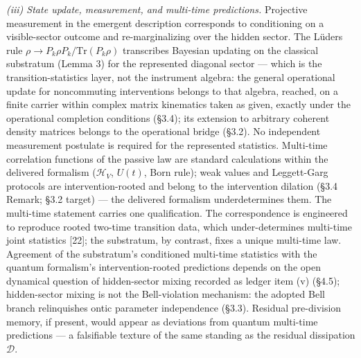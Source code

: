\documentclass[
]{article}
\begin{document}
\emph{(iii) State update, measurement, and multi-time predictions.}
Projective measurement in the emergent description corresponds to
conditioning on a visible-sector outcome and re-marginalizing over the
hidden sector. The Lüders rule
\(\rho \to P_k \rho P_k / \text{Tr}(P_k \rho)\) transcribes Bayesian
updating on the classical substratum (Lemma 3) for the represented
diagonal sector --- which is the transition-statistics layer, not the
instrument algebra: the general operational update for noncommuting
interventions belongs to that algebra, reached, on a finite carrier
within complex matrix kinematics taken as given, exactly under the
operational completion conditions (§3.4); its extension to arbitrary
coherent density matrices belongs to the operational bridge (§3.2). No
independent measurement postulate is required for the represented
statistics. Multi-time correlation functions of the passive law are
standard calculations within the delivered formalism (\(\mathcal{H}_V\),
\(U(t)\), Born rule); weak values and Leggett-Garg protocols are
intervention-rooted and belong to the intervention dilation (§3.4
Remark; §3.2 target) --- the delivered formalism underdetermines them.
The multi-time statement carries one qualification. The correspondence
is engineered to reproduce rooted two-time transition data, which
under-determines multi-time joint statistics {[}22{]}; the substratum,
by contrast, fixes a unique multi-time law. Agreement of the
substratum's conditioned multi-time statistics with the quantum
formalism's intervention-rooted predictions depends on the open
dynamical question of hidden-sector mixing recorded as ledger item (v)
(§4.5); hidden-sector mixing is not the Bell-violation mechanism: the
adopted Bell branch relinquishes ontic parameter independence (§3.3).
Residual pre-division memory, if present, would appear as deviations
from quantum multi-time predictions --- a falsifiable texture of the
same standing as the residual dissipation \(\mathcal{D}\).
\end{document}
